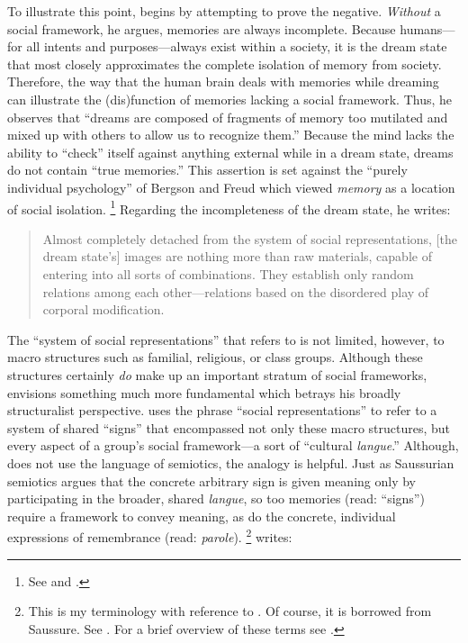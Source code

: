 To illustrate this point, \halbwachs begins  by attempting to prove the negative. \emph{Without} a social framework, he argues, memories are always incomplete. Because humans---for all intents and purposes---always exist within a society, it is the dream state that most closely approximates the complete isolation of memory from society.%
    \autocite[41--42]{halbwachs1992}
Therefore, the way that the human brain deals with memories while dreaming can illustrate the (dis)function of memories lacking a social framework. Thus, he observes that ``dreams are composed of fragments of memory too mutilated and mixed up with others to allow us to recognize them.''%
    \autocite[41]{halbwachs1992}
Because the mind lacks the ability to ``check'' itself against anything external while in a dream state, dreams do not contain ``true memories.''%
    \autocite[41]{halbwachs1992}
This assertion is set against the ``purely individual psychology'' of Bergson and Freud which viewed \emph{memory} as a location of social isolation.%
    \footnote{%
        See 
        \cite{ansellpearson_radstone-schwarz2011} and 
        \cite{terdiman_radstone-schwarz2011}.}
Regarding the incompleteness of the dream state, he writes:  

\begin{quote}
    Almost completely detached from the system of social representations, {[}the dream state's{]} images are nothing more than raw materials, capable of entering into all sorts of combinations. They establish only random relations among each other---relations based on the disordered play of corporal modification.%
        \autocite[42]{halbwachs1992}
\end{quote}  
\noindent
The ``system of social representations'' that \halbwachs refers to is not limited, however, to macro structures such as familial, religious, or class groups. Although these structures certainly \emph{do} make up an important stratum of social frameworks, \halbwachs envisions something much more fundamental which betrays his broadly structuralist perspective. \halbwachs uses the phrase ``social representations'' to refer to a system of shared ``signs'' that encompassed not only these macro structures, but every aspect of a group's social framework---a sort of ``cultural \emph{langue}.'' Although, \halbwachs does not use the language of semiotics, the analogy is helpful. Just as Saussurian semiotics argues that the concrete arbitrary sign is given meaning only by participating in the broader, shared \emph{langue}, so too memories (read: ``signs'') require a framework to convey meaning, as do the concrete, individual expressions of remembrance (read: \emph{parole}).%
    \footnote{%
        This is my terminology with reference to \halbwachs. Of course, it is borrowed from Saussure. See 
        \cite{saussure1916}. For a brief overview of these terms see 
        \cite[93--94]{smith-riley2009}.}
%
\halbwachs writes:  

